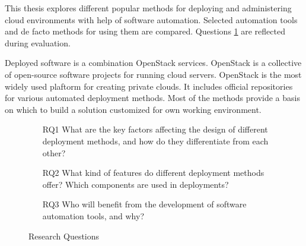 \documentclass[officiallayout]{tktla}
\begin{document}
This thesis explores different popular methods for deploying and administering
cloud environments with help of software automation. Selected automation tools
and de facto methods for using them are compared. Questions \ref{fig:rqs} are
reflected during evaluation.

Deployed software is a combination OpenStack services. OpenStack is a
collective of open-source software projects for running cloud servers.
OpenStack is the most widely used plaftorm for creating private clouds. It
includes official repositories for various automated deployment methods. Most
of the methods provide a basis on which to build a solution customized for own
working environment.

\begin{figure}[t]
\centering
\begin{itemize}
  \item [RQ1] What are the key factors affecting the design of different
              deployment methods, and how do they differentiate from each
              other?
  \item [RQ2] What kind of features do different deployment methods offer?
              Which components are used in deployments?
  \item [RQ3] Who will benefit from the development of software automation
              tools, and why?
\end{itemize}
\caption{Research Questions}
\label{fig:rqs}
\end{figure}

\begin{thebibliography}{9}

\end{thebibliography}
\end{document}
